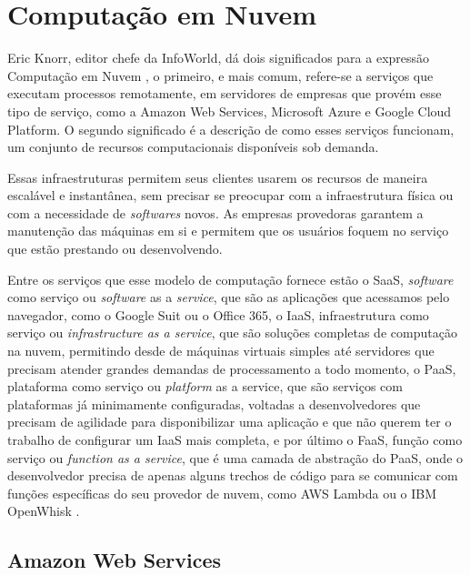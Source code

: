 \section{Computação em Nuvem}

\indent
\par Eric Knorr, editor chefe da InfoWorld, dá dois significados para a expressão Computação em Nuvem \cite{CloudComp}, o primeiro, e mais comum, refere-se a serviços que executam processos remotamente, em servidores de empresas que provém esse tipo de serviço, como a Amazon Web Services, Microsoft Azure e Google Cloud Platform. O segundo significado é a descrição de como esses serviços funcionam, um conjunto de recursos computacionais disponíveis sob demanda. 
\indent
\par Essas infraestruturas permitem seus clientes usarem os recursos de maneira escalável e instantânea, sem precisar se preocupar com a infraestrutura física ou com a necessidade de \textit{softwares} novos. As empresas provedoras garantem a manutenção das máquinas em si e permitem que os usuários foquem no serviço que estão prestando ou desenvolvendo.
\indent
\par Entre os serviços que esse modelo de computação fornece estão o SaaS, \textit{software} como serviço ou \textit{software} as a \textit{service}, que são as aplicações que acessamos pelo navegador, como o Google Suit ou o Office 365, o IaaS, infraestrutura como serviço ou \textit{infrastructure as a service}, que são soluções completas de computação na nuvem, permitindo desde de máquinas virtuais simples até servidores que precisam atender grandes demandas de processamento a todo momento, o PaaS, plataforma como serviço ou \textit{platform} as a service, que são serviços com plataformas já minimamente configuradas, voltadas a desenvolvedores que precisam de agilidade para disponibilizar uma aplicação e que não querem ter o trabalho de configurar um IaaS mais completa, e por último o FaaS, função como serviço ou \textit{function as a service}, que é uma camada de abstração do PaaS, onde o desenvolvedor precisa de apenas alguns trechos de código para se comunicar com funções específicas do seu provedor de nuvem, como AWS Lambda ou o IBM OpenWhisk \cite{CloudComp}.

\subsection{Amazon Web Services}

